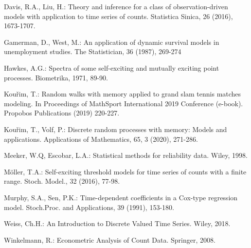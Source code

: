 \documentclass[11pt]{article}
\begin{document}
\begin{thebibliography}{99}

 Davis, R.A., Liu, H.: Theory and inference for a class
of observation-driven models with application to time series of
counts. Statistica Sinica, 26 (2016), 1673-1707.

 Gamerman, D., West, M.: An
application of dynamic survival models in unemployment studies.
The Statistician, 36 (1987),  269-274

 Hawkes, A.G.: Spectra of some self-exciting
and mutually exciting point processes. Biometrika, 1971, 89-90.

 Kou\v{r}im, T.: Random walks with memory applied to
grand slam tennis matches modeling. In Proceedings of MathSport
International 2019 Conference (e-book). Propobos
Publications (2019)  220-227.

 Kou\v{r}im, T., Volf, P.: Discrete random processes with memory:
Models and applications. Applications of Mathematics, 65, 3
(2020), 271-286.

 Meeker, W.Q, Escobar, L.A.: Statistical methods for reliability
data. Wiley, 1998.

 Möller, T.A.: Self-exciting threshold models for time series
of counts with a finite range. Stoch. Model., 32 (2016), 77-98.

 Murphy, S.A., Sen, P.K.: Time-dependent coefficients
in a Cox-type regression model. Stoch.Proc. and
Applications, 39 (1991), 153-180.

 Weiss, Ch.H.: An Introduction to Discrete Valued Time Series.
Wiley,  2018.

 Winkelmann, R.: Econometric Analysis of Count Data. Springer,  2008.

\end{thebibliography}

  
\end{document}
